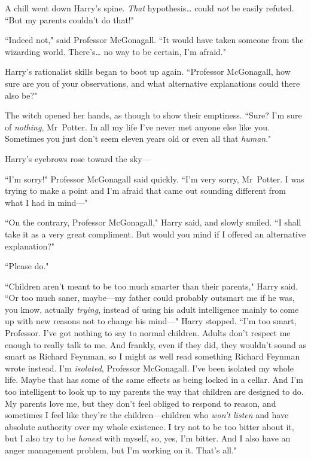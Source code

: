 A chill went down Harry's spine. \emph{That} hypothesis{\ldots} could \emph{not} be easily refuted. ``But my parents couldn't do that!"

``Indeed not," said Professor McGonagall. ``It would have taken someone from the wizarding world. There's{\ldots} no way to be certain, I'm afraid."

Harry's rationalist skills began to boot up again. ``Professor McGonagall, how sure are you of your observations, and what alternative explanations could there also be?"

The witch opened her hands, as though to show their emptiness. ``Sure? I'm sure of \emph{nothing}, Mr~Potter. In all my life I've never met anyone else like you. Sometimes you just don't seem eleven years old or even all that \emph{human}."

Harry's eyebrows rose toward the sky—

``I'm sorry!" Professor McGonagall said quickly. ``I'm very sorry, Mr~Potter. I was trying to make a point and I'm afraid that came out sounding different from what I had in mind—"

``On the contrary, Professor McGonagall," Harry said, and slowly smiled. ``I shall take it as a very great compliment. But would you mind if I offered an alternative explanation?"

``Please do."

``Children aren't meant to be too much smarter than their parents," Harry said. ``Or too much saner, maybe—my father could probably outsmart me if he was, you know, actually \emph{trying}, instead of using his adult intelligence mainly to come up with new reasons not to change his mind—" Harry stopped. ``I'm too smart, Professor. I've got nothing to say to normal children. Adults don't respect me enough to really talk to me. And frankly, even if they did, they wouldn't sound as smart as Richard Feynman, so I might as well read something Richard Feynman wrote instead. I'm \emph{isolated}, Professor McGonagall. I've been isolated my whole life. Maybe that has some of the same effects as being locked in a cellar. And I'm too intelligent to look up to my parents the way that children are designed to do. My parents love me, but they don't feel obliged to respond to reason, and sometimes I feel like they're the children—children who \emph{won't listen} and have absolute authority over my whole existence. I try not to be too bitter about it, but I also try to be \emph{honest} with myself, so, yes, I'm bitter. And I also have an anger management problem, but I'm working on it. That's all."

